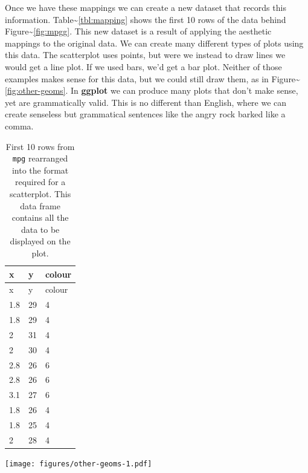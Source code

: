 Once we have these mappings we can create a new dataset that records
this information. Table\textasciitilde{}\ref{tbl:mapping} shows the
first 10 rows of the data behind Figure\textasciitilde{}\ref{fig:mpgg}.
This new dataset is a result of applying the aesthetic mappings to the
original data. We can create many different types of plots using this
data. The scatterplot uses points, but were we instead to draw lines we
would get a line plot. If we used bars, we'd get a bar plot. Neither of
those examples makes sense for this data, but we could still draw them,
as in Figure\textasciitilde{}\ref{fig:other-geoms}. In \textbf{ggplot}
we can produce many plots that don't make sense, yet are grammatically
valid. This is no different than English, where we can create senseless
but grammatical sentences like the angry rock barked like a comma.

\begin{longtable}[c]{@{}lll@{}}
\caption{First 10 rows from \texttt{mpg} rearranged into the format
required for a scatterplot. This data frame contains all the data to be
displayed on the plot.}\tabularnewline
\toprule
x & y & colour\tabularnewline
\midrule
\endfirsthead
\toprule
x & y & colour\tabularnewline
\midrule
\endhead
1.8 & 29 & 4\tabularnewline
1.8 & 29 & 4\tabularnewline
2 & 31 & 4\tabularnewline
2 & 30 & 4\tabularnewline
2.8 & 26 & 6\tabularnewline
2.8 & 26 & 6\tabularnewline
3.1 & 27 & 6\tabularnewline
1.8 & 26 & 4\tabularnewline
1.8 & 25 & 4\tabularnewline
2 & 28 & 4\tabularnewline
\bottomrule
\end{longtable}

\begin{Shaded}
\begin{Highlighting}[]
   \NormalTok{) +}\StringTok{ }
\StringTok{  }\NormalTok{(} \NormalTok{)}
\end{Highlighting}
\end{Shaded}

\texttt{[image: figures/other-geoms-1.pdf]}

\begin{Shaded}
\begin{Highlighting}[]
   \NormalTok{, }
   \NormalTok{, } \NormalTok{) +}\StringTok{ }
\StringTok{  }\NormalTok{(} \NormalTok{)}
\end{Highlighting}
\end{Shaded}

